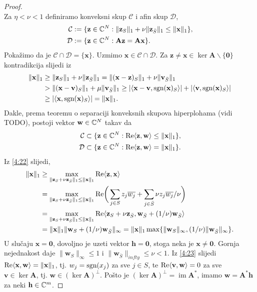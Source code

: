 \documentclass[a4paper,twoside,12pt]{memoir} %
\newcommand{\vect}[1]{\mathbf{#1}}
\renewcommand{\vec}{\vect}
\newcommand{\norm}[1]{\|{#1}\|}
\newcommand{\sgn}{\text{\normalfont{sgn}}}
\renewcommand{\Re}{\text{\normalfont{Re}}}
\DeclareMathOperator{\im}{im}
\begin{document}
\begin{proof}
\begin{equation*}
    \end{equation*}
    Za $\eta < \nu < 1$ definiramo konveksni skup $\mathcal{C}$ i afin skup $\mathcal{D}$,
    \begin{align*}
        \mathcal{C} &:= \{ \vec z \in \C^N : \norm{\vec z_S}_1 + \nu \norm{\vec z_{\bar S}}_1 \leq \norm{\vec x}_1 \},\\
        \mathcal{D} &:= \{ \vec z \in \C^N : \vec{Az} = \vec{Ax} \}.
    \end{align*}
    Poka\v{z}imo da je $\mathcal{C} \cap \mathcal{D} = \{\vec x\}$. Uzmimo $\vec x \in \mathcal{C} \cap \mathcal{D}$. Za $ \vec z \neq \vec x \in \ker \vec A \backslash \{\vec 0\}$ kontradikcija slijedi iz
    \begin{align*}
        \norm{\vec x}_1 &\geq \norm{\vec z_S}_1 + \nu \norm{\vec z_{\bar S}}_1 = \norm{(\vec x - \vec z)_S}_1 + \nu \norm{\vec v_{\bar S}}_1\\
        &> \norm{(\vec x - \vec v)_S}_1 + \mu \norm{\vec v_{\bar S}}_1 \geq |\langle \vec x - \vec v, \sgn(\vec x)_S \rangle| + |\langle \vec v, \sgn(\vec x)_S \rangle|\\
        &\geq |\langle \vec x, \sgn(\vec x)_S \rangle| = \norm{\vec x}_1.
    \end{align*}
    Dakle, prema teoremu o separaciji konveksnih skupova hiperplohama (vidi TODO), postoji vektor $\vec w \in \C^N$ takav da
    \begin{align}
        \mathcal{C} \subset \{ \vec z \in \C^N: \Re \langle \vec z, \vec w \rangle \leq \norm{\vec x}_1 \}\label{4:22},\\
        \mathcal{D} \subset \{ \vec z \in \C^N: \Re \langle \vec z, \vec w \rangle = \norm{\vec x}_1 \}\label{4:23}.
    \end{align}
    Iz \eqref{4:22} slijedi, 
    \begin{align*}
        \norm{\vec x}_1 &\geq \max_{\norm{\vec z_S + \nu \vec z_{\bar S}}_1 \leq \norm{\vec x}_1} \Re \langle \vec z, \vec x\rangle \\
        &=\max_{\norm{\vec z_S + \nu \vec z_{\bar S}}_1 \leq \norm{\vec x}_1} \Re \bigg( \sum_{j \in S} z_j \overline{w_j} + \sum_{j \in \bar S} \nu z_j \overline{w_j}/ \nu \bigg)\\
        &= \max_{\norm{\vec z_S + \nu \vec z_{\bar S}}_1 \leq \norm{\vec x}_1} \Re \langle \vec z_S + \nu \vec z_{\bar S}, \vec w_{\bar S} + (1/\nu) \vec w_{\bar S} \rangle \\
        &= \norm{\vec x}_1 \norm{\vec w_S + (1/\nu)\vec w_{\bar S}}_{\infty} = \norm{\vec x}_1 \max\{ \norm{\vec w_S}_{\infty}, (1/\nu) \norm{\vec w_{\bar S}}_{\infty} \}.
    \end{align*}
    U slu\v{c}aju $\vec x = \vec 0$, dovoljno je uzeti vektor $\vec h = \vec 0$, stoga neka je $\vec x \neq \vec 0$. Gornja nejednakost daje $\norm{\vec w_S}_{\infty} \leq 1$ i $\norm{\vec w_{\bar S}}_{infty} \leq \nu < 1$. Iz \eqref{4:23} slijedi $\Re \langle \vec x, \vec w\rangle = \norm{\vec x}_1$, tj. $w_j = \sgn(x_j)$ za sve $j \in S$, te $\Re \langle \vec v, \vec w \rangle = 0$ za sve $\vec v \in \ker \vec A$, tj. $\vec w \in (\ker \vec A)^{\perp}$. Po\v{s}to je $(\ker \vec A)^{\perp} = \im \vec A^*$, imamo $\vec w = \vec A^* \vec h$ za neki $\vec h \in \C^m$.
\end{proof}
\end{document}
